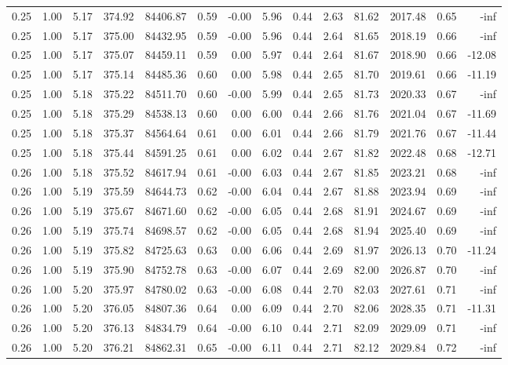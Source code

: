 \begin{table}[!ht]
\begin{tabular}{rrrrrrrrrrrrrr}
0.25 & 1.00 & 5.17 & 374.92 & 84406.87 & 0.59 & -0.00 & 5.96 & 0.44 & 2.63 & 81.62 & 2017.48 & 0.65 & -inf \\
0.25 & 1.00 & 5.17 & 375.00 & 84432.95 & 0.59 & -0.00 & 5.96 & 0.44 & 2.64 & 81.65 & 2018.19 & 0.66 & -inf \\
0.25 & 1.00 & 5.17 & 375.07 & 84459.11 & 0.59 & 0.00 & 5.97 & 0.44 & 2.64 & 81.67 & 2018.90 & 0.66 & -12.08 \\
0.25 & 1.00 & 5.17 & 375.14 & 84485.36 & 0.60 & 0.00 & 5.98 & 0.44 & 2.65 & 81.70 & 2019.61 & 0.66 & -11.19 \\
0.25 & 1.00 & 5.18 & 375.22 & 84511.70 & 0.60 & -0.00 & 5.99 & 0.44 & 2.65 & 81.73 & 2020.33 & 0.67 & -inf \\
0.25 & 1.00 & 5.18 & 375.29 & 84538.13 & 0.60 & 0.00 & 6.00 & 0.44 & 2.66 & 81.76 & 2021.04 & 0.67 & -11.69 \\
0.25 & 1.00 & 5.18 & 375.37 & 84564.64 & 0.61 & 0.00 & 6.01 & 0.44 & 2.66 & 81.79 & 2021.76 & 0.67 & -11.44 \\
0.25 & 1.00 & 5.18 & 375.44 & 84591.25 & 0.61 & 0.00 & 6.02 & 0.44 & 2.67 & 81.82 & 2022.48 & 0.68 & -12.71 \\
0.26 & 1.00 & 5.18 & 375.52 & 84617.94 & 0.61 & -0.00 & 6.03 & 0.44 & 2.67 & 81.85 & 2023.21 & 0.68 & -inf \\
0.26 & 1.00 & 5.19 & 375.59 & 84644.73 & 0.62 & -0.00 & 6.04 & 0.44 & 2.67 & 81.88 & 2023.94 & 0.69 & -inf \\
0.26 & 1.00 & 5.19 & 375.67 & 84671.60 & 0.62 & -0.00 & 6.05 & 0.44 & 2.68 & 81.91 & 2024.67 & 0.69 & -inf \\
0.26 & 1.00 & 5.19 & 375.74 & 84698.57 & 0.62 & -0.00 & 6.05 & 0.44 & 2.68 & 81.94 & 2025.40 & 0.69 & -inf \\
0.26 & 1.00 & 5.19 & 375.82 & 84725.63 & 0.63 & 0.00 & 6.06 & 0.44 & 2.69 & 81.97 & 2026.13 & 0.70 & -11.24 \\
0.26 & 1.00 & 5.19 & 375.90 & 84752.78 & 0.63 & -0.00 & 6.07 & 0.44 & 2.69 & 82.00 & 2026.87 & 0.70 & -inf \\
0.26 & 1.00 & 5.20 & 375.97 & 84780.02 & 0.63 & -0.00 & 6.08 & 0.44 & 2.70 & 82.03 & 2027.61 & 0.71 & -inf \\
0.26 & 1.00 & 5.20 & 376.05 & 84807.36 & 0.64 & 0.00 & 6.09 & 0.44 & 2.70 & 82.06 & 2028.35 & 0.71 & -11.31 \\
0.26 & 1.00 & 5.20 & 376.13 & 84834.79 & 0.64 & -0.00 & 6.10 & 0.44 & 2.71 & 82.09 & 2029.09 & 0.71 & -inf \\
0.26 & 1.00 & 5.20 & 376.21 & 84862.31 & 0.65 & -0.00 & 6.11 & 0.44 & 2.71 & 82.12 & 2029.84 & 0.72 & -inf \\

\end{tabular}
\end{table}
